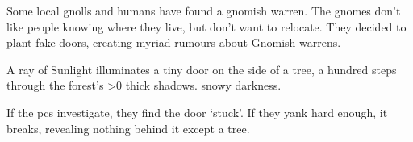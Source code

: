 
\ifodd\year

  Some local gnolls and humans have found a gnomish warren.
  The gnomes don't like people knowing where they live, but don't want to relocate.
  They decided to plant fake doors, creating myriad rumours about Gnomish warrens.

  \begin{boxtext}
    A ray of Sunlight illuminates a tiny door on the side of a tree, a hundred \glspl{step} through the forest's
    \ifnum\value{temperature}>0%
      thick shadows.
    \else
      snowy darkness.
    \fi
  \end{boxtext}

  If the \glspl{pc} investigate, they find the door `stuck'.
  If they yank hard enough, it breaks, revealing nothing behind it except a tree.

\fi

